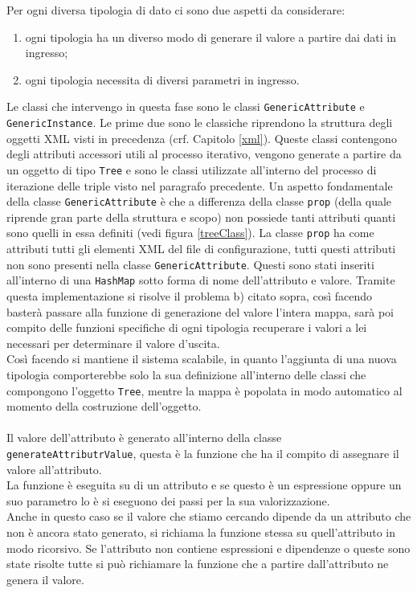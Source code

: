 \documentclass[12pt,a4paper,italian]{article}
\begin{document}
		Per ogni diversa tipologia di dato ci sono due aspetti da considerare: 
		\begin{enumerate}
			\item ogni tipologia ha un diverso modo di generare il valore a partire dai dati in ingresso;
			\item ogni tipologia necessita di diversi parametri in ingresso.
		\end{enumerate}
		Le classi che intervengo in questa fase sono le classi \texttt{GenericAttribute} e \texttt{GenericInstance}. Le prime due sono le classiche riprendono la struttura degli oggetti XML visti in precedenza (crf. Capitolo \ref{xml}). Queste classi contengono degli attributi accessori utili al processo iterativo, vengono generate a partire da un oggetto di tipo \texttt{Tree} e sono le classi utilizzate all'interno del processo di iterazione delle triple visto nel paragrafo precedente. Un aspetto fondamentale della classe \texttt{GenericAttribute} è che a differenza della classe \texttt{prop} (della quale riprende gran parte della struttura e scopo) non possiede tanti attributi quanti sono quelli in essa definiti (vedi figura \ref{treeClass}). La classe \texttt{prop} ha come attributi tutti gli elementi XML del file di configurazione, tutti questi attributi non sono presenti nella classe \texttt{GenericAttribute}. Questi sono stati inseriti all'interno di una \texttt{HashMap} sotto forma di nome dell'attributo e valore. Tramite questa implementazione si risolve il problema b) citato sopra, così facendo basterà passare alla funzione di generazione del valore l'intera mappa, sarà poi compito delle funzioni specifiche di ogni tipologia recuperare i valori a lei necessari per determinare il valore d'uscita. \\Così facendo si mantiene  il sistema scalabile, in quanto l'aggiunta di una nuova tipologia comporterebbe solo la sua definizione all'interno delle classi che compongono l'oggetto \texttt{Tree}, mentre la mappa è popolata in modo automatico al momento della costruzione dell'oggetto.\\
		\\
		Il valore dell'attributo è generato all'interno della classe\\ \texttt{generateAttributrValue}, questa è la funzione che ha il compito di assegnare il valore all'attributo.\\
		La funzione è eseguita su di un attributo e se questo è un espressione oppure un suo parametro lo è si eseguono dei passi per la sua valorizzazione.\\ Anche in questo caso se il valore che stiamo cercando dipende da un attributo che non è ancora stato generato, si richiama la funzione stessa su quell'attributo in modo ricorsivo. Se l'attributo non contiene espressioni e dipendenze o queste sono state risolte tutte si può richiamare  la funzione che a partire dall'attributo ne genera il valore.\\
\end{document}
